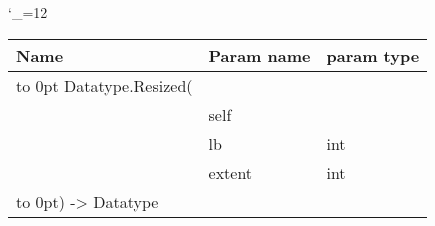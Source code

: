 \begingroup \catcode`\_=12 \tt
\begin{tabular}{lll}
\toprule
\textrm{Name}&\textrm{Param name}&\textrm{param type}\\
\midrule
\hbox to 0pt {Datatype.Resized(\hss}\\
& self\\
& lb & int\\
& extent & int\\
\hbox to 0pt{) -> Datatype\hss}\\
\bottomrule
\end{tabular}
\endgroup
